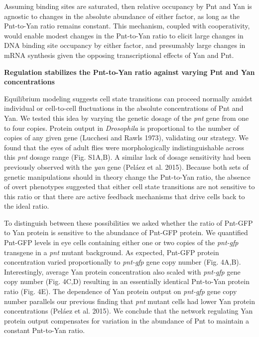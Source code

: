 Assuming binding sites are saturated, then relative occupancy by Pnt and Yan is agnostic to changes in the absolute abundance of either factor, as long as the Pnt-to-Yan ratio remains constant. This mechanism, coupled with cooperativity, would enable modest changes in the Pnt-to-Yan ratio to elicit large changes in DNA binding site occupancy by either factor, and presumably large changes in mRNA synthesis given the opposing transcriptional effects of Yan and Pnt.

\textbf{Regulation stabilizes the Pnt-to-Yan ratio against varying Pnt and Yan concentrations}

Equilibrium modeling suggests cell state transitions can proceed normally amidst individual or cell-to-cell fluctuations in the absolute concentrations of Pnt and Yan. We tested this idea by varying the genetic dosage of the \emph{pnt} gene from one to four copies. Protein output in \emph{Drosophila} is proportional to the number of copies of any given gene (Lucchesi and Rawls 1973), validating our strategy. We found that the eyes of adult flies were morphologically indistinguishable across this \emph{pnt} dosage range (Fig. S1A,B). A similar lack of dosage sensitivity had been previously observed with the \emph{yan} gene (Peláez et al. 2015). Because both sets of genetic manipulations should in theory change the Pnt-to-Yan ratio, the absence of overt phenotypes suggested that either cell state transitions are not sensitive to this ratio or that there are active feedback mechanisms that drive cells back to the ideal ratio.

To distinguish between these possibilities we asked whether the ratio of Pnt-GFP to Yan protein is sensitive to the abundance of Pnt-GFP protein. We quantified Pnt-GFP levels in eye cells containing either one or two copies of the \emph{pnt-gfp} transgene in a \emph{pnt} mutant background. As expected, Pnt-GFP protein concentration varied proportionally to \emph{pnt-gfp} gene copy number (Fig. 4A,B). Interestingly, average Yan protein concentration also scaled with \emph{pnt-gfp} gene copy number (Fig. 4C,D) resulting in an essentially identical Pnt-to-Yan protein ratio (Fig. 4E). The dependence of Yan protein output on \emph{pnt-gfp} gene copy number parallels our previous finding that \emph{pnt} mutant cells had lower Yan protein concentrations (Peláez et al. 2015). We conclude that the network regulating Yan protein output compensates for variation in the abundance of Pnt to maintain a constant Pnt-to-Yan ratio.

